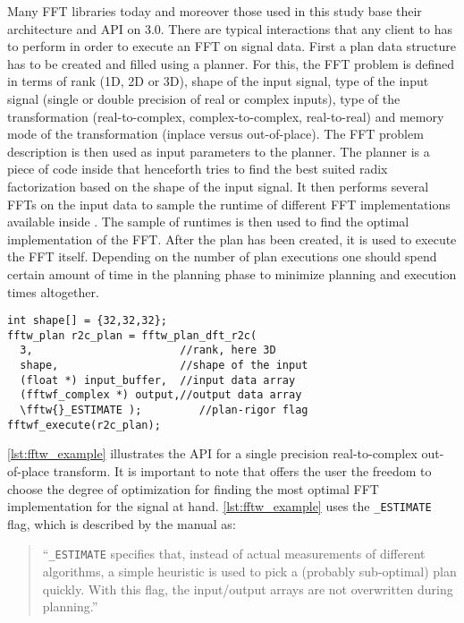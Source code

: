 Many FFT libraries today and moreover those used in this study base their architecture and API on \fftw{} $3.0$. There are typical interactions that any client to \fftw{} has to perform in order to execute an FFT on signal data. First a plan data structure has to be created and filled using a planner. For this, the FFT problem is defined in terms of rank (1D, 2D or 3D), shape of the input signal, type of the input signal (single or double precision of real or complex inputs), type of the transformation (real-to-complex, complex-to-complex, real-to-real) and memory mode of the transformation (inplace versus out-of-place). The FFT problem description is then used as input parameters to the planner. The planner is a piece of code inside \fftw{} that henceforth tries to find the best suited radix factorization based on the shape of the input signal. It then performs several FFTs on the input data to sample the runtime of different FFT implementations available inside \fftw{}. The sample of runtimes is then used to find the optimal implementation of the FFT. After the plan has been created, it is used to execute the FFT itself.
Depending on the number of plan executions one should spend certain amount of time in the planning phase to minimize planning and execution times altogether.
\begin{lstlisting}[caption={Minimal usage example of the \fftw{} single precision real-to-complex planner API. Memory management is omitted.},label={lst:fftw_example}]
int shape[] = {32,32,32};
fftw_plan r2c_plan = fftw_plan_dft_r2c(
  3,                       //rank, here 3D
  shape,                   //shape of the input
  (float *) input_buffer,  //input data array
  (fftwf_complex *) output,//output data array
  \fftw{}_ESTIMATE );         //plan-rigor flag
fftwf_execute(r2c_plan);
\end{lstlisting}
\cref{lst:fftw_example} illustrates the \fftw{} API for a single precision real-to-complex out-of-place transform. It is important to note that \fftw{} offers the user the freedom to choose the degree of optimization for finding the most optimal FFT implementation for the signal at hand. \cref{lst:fftw_example} uses the \texttt{\fftw{}\_ESTIMATE} flag, which is described by the \fftw{} manual \cite{fftw_manual} as:
%
\begin{quote}
``\texttt{\fftw{}\_ESTIMATE} specifies that, instead of actual measurements of different algorithms, a simple heuristic is used to pick a (probably sub-optimal) plan quickly. With this flag, the input/output arrays are not overwritten during planning.''
\end{quote}
